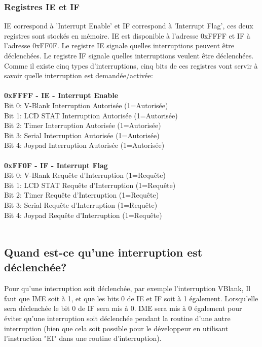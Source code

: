 \documentclass{report}
\begin{document}
\subsubsection{Registres IE et IF} 
IE correspond à 'Interrupt Enable' et IF correspond à 'Interrupt Flag', ces deux registres sont stockés en mémoire. IE est disponible à l'adresse 0xFFFF et IF à l'adresse 0xFF0F. Le registre IE signale quelles interruptions peuvent être déclenchées. Le registre IF signale quelles interruptions veulent être déclenchées.
Comme il existe cinq types d'interruptions, cinq bits de ces registres vont servir à savoir quelle interruption est demandée/activée:\\\\
\textbf{0xFFFF - IE - Interrupt Enable} \\
Bit 0: V-Blank  Interruption Autorisée  (1=Autorisée)\\
Bit 1: LCD STAT Interruption Autorisée  (1=Autorisée)\\
Bit 2: Timer    Interruption Autorisée  (1=Autorisée)\\
Bit 3: Serial   Interruption Autorisée  (1=Autorisée)\\
Bit 4: Joypad   Interruption Autorisée  (1=Autorisée)\\\\
\textbf{0xFF0F - IF - Interrupt Flag} \\
Bit 0: V-Blank  Requête d'Interruption  (1=Requête)\\
Bit 1: LCD STAT Requête d'Interruption  (1=Requête)\\
Bit 2: Timer    Requête d'Interruption  (1=Requête)\\
Bit 3: Serial   Requête d'Interruption  (1=Requête)\\
Bit 4: Joypad   Requête d'Interruption  (1=Requête)\\\\

\subsection{Quand est-ce qu'une interruption est déclenchée?}
Pour qu'une interruption soit déclenchée, par exemple l'interruption VBlank, Il faut que IME soit à 1, et que les bits 0 de IE et IF soit à 1 également.
Lorsqu'elle sera déclenchée le bit 0 de IF sera mis à 0. IME sera mis à 0 également pour éviter qu'une interruption soit déclenchée pendant la routine d'une autre interruption (bien que cela soit possible pour le développeur en utilisant l'instruction "EI" dans une routine d'interruption).
\end{document}
